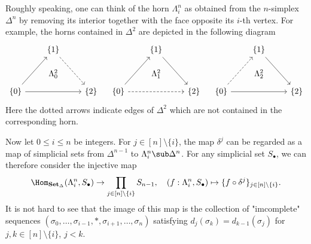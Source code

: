 \begin{example}\label{simplicial set horn description}
Roughly speaking, one can think of the horn $\Lambda_i^n$ as obtained from the $n$-simplex $\Delta^n$ by removing its interior together with the face opposite its $i$-th vertex. For example, the horns contained in $\Delta^2$ are depicted in the following diagram
\[\begin{tikzcd}[row sep=12mm,column sep=8mm]
&\{1\}\ar[d,phantom,"\Lambda_0^2"]\ar[rd,dashed]&\\
\{0\}\ar[ru]\ar[rr]&{}&\{2\}
\end{tikzcd}\quad \begin{tikzcd}[row sep=12mm,column sep=8mm]
&\{1\}\ar[d,phantom,"\Lambda_1^2"]\ar[rd]&\\
\{0\}\ar[ru]\ar[rr,dashed]&{}&\{2\}
\end{tikzcd}\quad \begin{tikzcd}[row sep=12mm,column sep=8mm]
&\{1\}\ar[d,phantom,"\Lambda_2^2"]\ar[rd]&\\
\{0\}\ar[ru,dashed]\ar[rr]&{}&\{2\}
\end{tikzcd}\]
Here the dotted arrows indicate edges of $\Delta^2$ which are not contained in the corresponding horn.\par
Now let $0\leq i\leq n$ be integers. For $j\in[n]\setminus\{i\}$, the map $\delta^j$ can be regarded as a map of simplicial sets from $\Delta^{n-1}$ to $\Lambda_i^n\sub\Delta^n$. For any simplicial set $S_\bullet$, we can therefore consider the injective map
\[\Hom_{\mathbf{Set}_\Delta}(\Lambda_i^n,S_\bullet)\to\prod_{j\in[n]\setminus\{i\}}S_{n-1},\quad (f:\Lambda_i^n,S_\bullet)\mapsto\{f\circ\delta^j\}_{j\in[n]\setminus\{i\}}.\]
It is not hard to see that the image of this map is the collection of "imcomplete" sequences $(\sigma_0,\dots,\sigma_{i-1},\ast,\sigma_{i+1},\dots,\sigma_n)$ satisfying $d_j(\sigma_k)=d_{k-1}(\sigma_j)$ for $j,k\in[n]\setminus\{i\}$, $j<k$.
\end{example}

